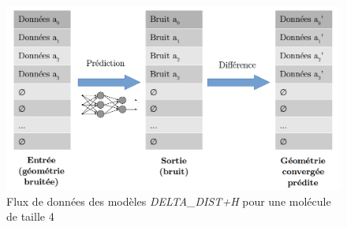 \begin{figure}
	\centering
	
	\includegraphics[scale=0.35]{images/flux_donnees.png}
	
	\caption{Flux de données des modèles \emph{DELTA\_DIST+H} pour une molécule de taille 4}
	\label{fig_flux}
\end{figure}
